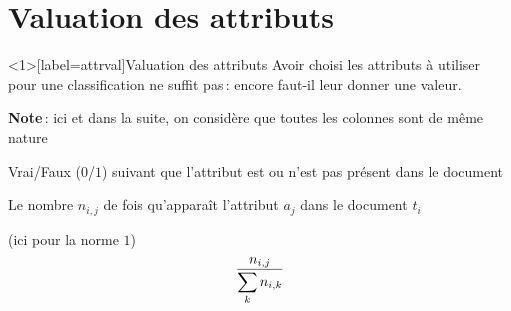 \documentclass[../allslides.tex]{subfiles}
\begin{document}
\section{Valuation des attributs}
\begin{frame}<1>[label=attrval]{Valuation des attributs}
	Avoir choisi les attributs à utiliser pour une classification ne suffit pas : encore faut-il leur donner une \alert{valeur}.

	\textbf{Note} : ici et dans la suite, on considère que toutes les colonnes sont de même nature

	\begin{description}[*]
		\item<2->[Booléenne] Vrai/Faux (\(0\)/\(1\)) suivant que l'attribut est ou n'est pas présent dans le document
		\item<3->[Occurrences] Le nombre \(n_{i,j}\) de fois qu'apparaît l'attribut \(a_j\) dans le document \(t_i\)
		\item<4->[Fréquences normalisées par ligne] (ici pour la norme \(1\))
			\begin{equation}
				\frac{\mathnode{freqfracnum}{n_{i,j}}}{\mathnode{freqfracden}{\sum_k n_{i,k}}}
			\end{equation}
	\end{description}
\end{frame}
\end{document}
